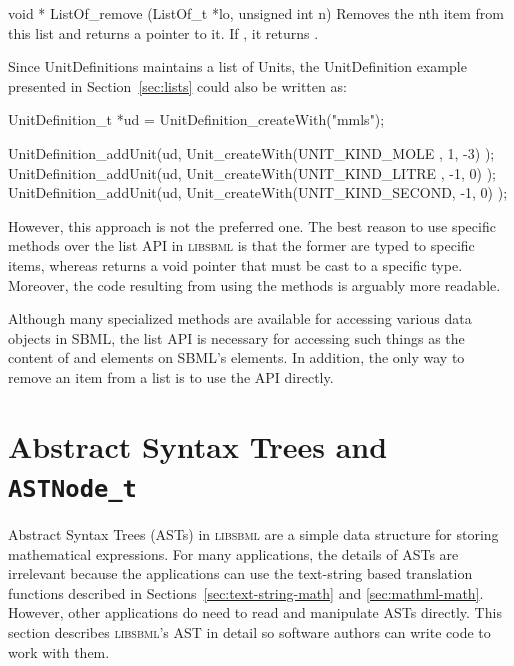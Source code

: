 \documentclass{sbmlmanual}
\newcommand{\libsbml}{\textsc{libsbml}}
\begin{document}
\begin{methoddef}{void * ListOf\_remove (ListOf\_t *lo, unsigned int n)}
  Removes the nth item from this list and returns a pointer to it.  If 
  , it returns .
\end{methoddef}


Since UnitDefinitions maintains a list of Units, the UnitDefinition
example presented in Section~\ref{sec:lists} could also be written as:


\begin{example}[c]
UnitDefinition_t *ud = UnitDefinition_createWith("mmls");

UnitDefinition_addUnit(ud, Unit_createWith(UNIT_KIND_MOLE  ,  1, -3) );
UnitDefinition_addUnit(ud, Unit_createWith(UNIT_KIND_LITRE , -1,  0) );
UnitDefinition_addUnit(ud, Unit_createWith(UNIT_KIND_SECOND, -1,  0) );
\end{example}


However, this approach is not the preferred one.  The best reason to use
specific  methods over the list API in \libsbml{} is
that the former are typed to specific items, whereas 
returns a void pointer that must be cast to a specific type.  Moreover, the
code resulting from using the  methods is arguably
more readable.

Although many specialized methods are available for accessing various data
objects in SBML, the list API is necessary for accessing such things as the
content of  and  elements on SBML's
 elements.  In addition, the only way to remove an item
from a list is to use the API directly.


\section{Abstract Syntax Trees and \texttt{ASTNode\_t}}
\label{app:ast}

Abstract Syntax Trees (ASTs) in \libsbml{} are a simple data structure for
storing mathematical expressions.  For many applications, the details of
ASTs are irrelevant because the applications can use the text-string based
translation functions described in Sections~\ref{sec:text-string-math} and
\ref{sec:mathml-math}.  However, other applications do need to read and
manipulate ASTs directly.  This section describes \libsbml{}'s AST in
detail so software authors can write code to work with them.
\end{document}
